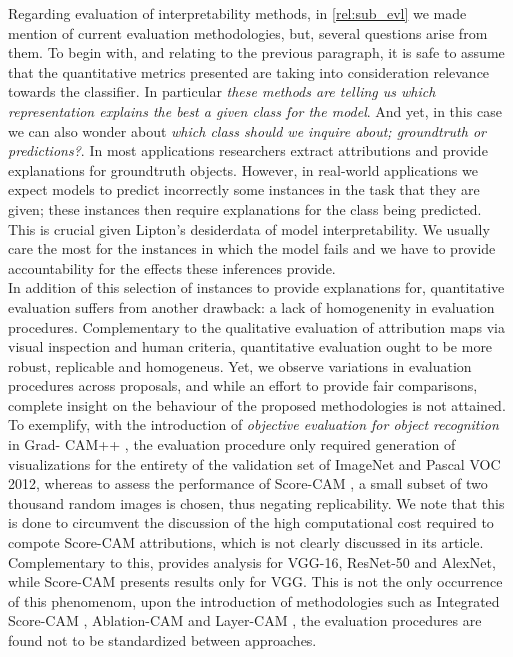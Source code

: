 \noindent Regarding evaluation of interpretability methods, in \autoref{rel:sub_evl} we made mention 
of current evaluation methodologies, but, several questions arise from them. To begin with, and                                                                                                          
relating to the previous paragraph, it is safe to assume that the quantitative metrics presented 
are taking into consideration relevance towards the classifier. In particular \emph{these 
methods are telling us which representation explains the best a given class for the model}. 
And yet, in this case we can also wonder about \emph{which class should we inquire about; 
groundtruth or predictions?}. In most applications researchers extract attributions and provide 
explanations for groundtruth objects. However, in real-world applications we expect models to 
predict incorrectly some instances in the task that they are given; these instances then require 
explanations for the class being predicted. This is crucial given Lipton's desiderdata of model 
interpretability. We usually care the most for the instances in which the model fails and we have 
to provide accountability for the effects these inferences provide.\\

\noindent In addition of this selection of instances to provide explanations for, quantitative 
evaluation suffers from another drawback: a lack of homogenenity in evaluation procedures. 
Complementary to the qualitative evaluation of attribution maps via visual inspection and human 
criteria, quantitative evaluation ought to be more robust, replicable and homogeneus. Yet, we 
observe variations in evaluation procedures across proposals, and while an effort to provide fair 
comparisons, complete insight on the behaviour of the proposed methodologies is not attained. 
To exemplify, with the introduction of \emph{objective evaluation for object recognition} in Grad-
CAM++ \autocite{chattopadhay2018grad}, the evaluation procedure only required generation of 
visualizations for the entirety of the validation set of ImageNet and Pascal VOC 2012, whereas 
to assess the performance of Score-CAM \autocite{wang2020score}, a small subset of two thousand 
random images is chosen, thus negating replicability. We note that this is done to circumvent the 
discussion of the high computational cost required to compote Score-CAM attributions, which is  
not clearly discussed in its article. Complementary to this, 
\cite{chattopadhay2018grad} provides analysis for VGG-16, ResNet-50 and AlexNet, while Score-CAM 
presents results only for VGG.  This is not the only occurrence of this phenomenom, upon the 
introduction of methodologies such as Integrated Score-CAM \autocite{naidu2020cam}, Ablation-CAM
\autocite{ablationcam} and Layer-CAM \autocite{jiang2021layercam}, the evaluation procedures are 
found not to be standardized between approaches.\\

